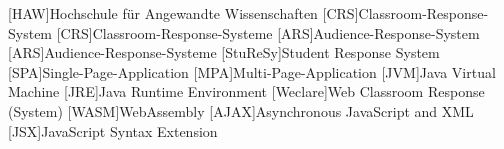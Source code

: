 \begin{acronym}[StuReSy]
    [HAW]{Hochschule für Angewandte Wissenschaften}
    [CRS]{Classroom-Response-System}
    [CRS]{Classroom-Response-Systeme}
    [ARS]{Audience-Response-System}
    [ARS]{Audience-Response-Systeme}
    [StuReSy]{Student Response System}
    [SPA]{Single-Page-Application}
    [MPA]{Multi-Page-Application}
    [JVM]{Java Virtual Machine}
    [JRE]{Java Runtime Environment}
    [Weclare]{Web Classroom Response (System)}
    [WASM]{WebAssembly}
    [AJAX]{Asynchronous JavaScript and XML}
    [JSX]{JavaScript Syntax Extension}
\end{acronym}
